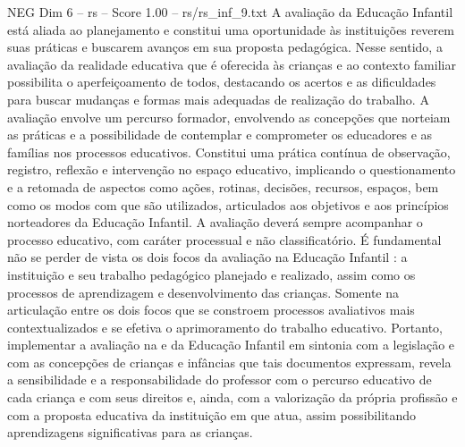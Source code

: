 \begin{textsample}{NEG Dim 6 – rs – Score 1.00 – rs/rs\_inf\_9.txt}
A avaliação da Educação Infantil está aliada ao planejamento e constitui uma oportunidade às instituições reverem suas práticas e buscarem avanços em sua proposta pedagógica.
Nesse sentido, a avaliação da realidade educativa que é oferecida às crianças e ao contexto familiar possibilita o aperfeiçoamento de todos, destacando os acertos e as dificuldades para buscar mudanças e formas mais adequadas de realização do trabalho.
A avaliação envolve um percurso formador, envolvendo as concepções que norteiam as práticas e a possibilidade de contemplar e comprometer os educadores e as famílias nos processos educativos.
Constitui uma prática contínua de observação, registro, reflexão e intervenção no espaço educativo, implicando o questionamento e a retomada de aspectos como ações, rotinas, decisões, recursos, espaços, bem como os modos com que são utilizados, articulados aos objetivos e aos princípios norteadores da Educação Infantil.
A avaliação deverá sempre acompanhar o processo educativo, com caráter processual e não classificatório.
É fundamental não se perder de vista os dois focos da avaliação na Educação Infantil : a instituição e seu trabalho pedagógico planejado e realizado, assim como os processos de aprendizagem e desenvolvimento das crianças.
Somente na articulação entre os dois focos que se constroem processos avaliativos mais contextualizados e se efetiva o aprimoramento do trabalho educativo.
Portanto, implementar a avaliação na e da Educação Infantil em sintonia com a legislação e com as concepções de crianças e infâncias que tais documentos expressam, revela a sensibilidade e a responsabilidade do professor com o percurso educativo de cada criança e com seus direitos e, ainda, com a valorização da própria profissão e com a proposta educativa da instituição em que atua, assim possibilitando aprendizagens significativas para as crianças.

\end{textsample}
